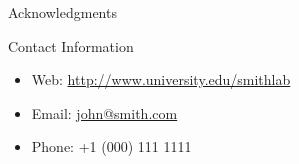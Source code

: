\documentclass[final,hyperref={pdfpagelabels=false}]{beamer}
\begin{document}
\begin{frame}[t]
\begin{columns}[t]
\begin{column}{.465\textwidth}
\begin{block}{Acknowledgments}
\end{block}



\begin{block}{Contact Information}

\begin{itemize}
\item Web: \href{http://www.university.edu/smithlab}{http://www.university.edu/smithlab}
\item Email: \href{mailto:john@smith.com}{john@smith.com}
\item Phone: +1 (000) 111 1111
\end{itemize}

\end{block}


\end{column} %

\begin{column}{.015\textwidth}\end{column} %

\end{columns} %

\end{frame} %
\end{document}
